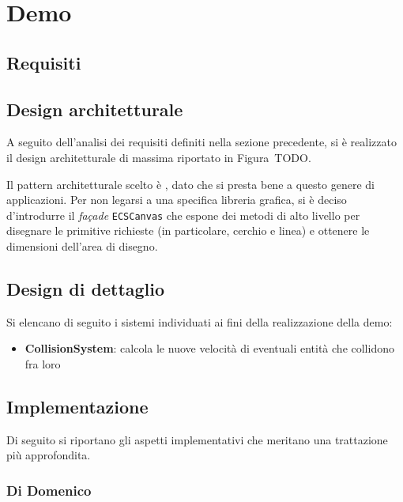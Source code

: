 \chapter{Demo}\label{ch:demo}

\section{Requisiti}\label{sec:demo-requisiti}

\section{Design architetturale}\label{sec:demo-design-architetturale}
A seguito dell'analisi dei requisiti definiti nella sezione precedente, si è realizzato il design architetturale di
massima riportato in Figura~TODO.

Il pattern architetturale scelto è \ECS, dato che si presta bene a questo genere di applicazioni.
Per non legarsi a una specifica libreria grafica, si è deciso d'introdurre il \textit{façade} \texttt{ECSCanvas}
che espone dei metodi di alto livello per disegnare le primitive richieste (in particolare, cerchio e linea) e ottenere
le dimensioni dell'area di disegno.

\section{Design di dettaglio}\label{sec:demo-design-di-dettaglio}

Si elencano di seguito i sistemi individuati ai fini della realizzazione della demo:
\begin{itemize}
    \item \textbf{CollisionSystem}: calcola le nuove velocità di eventuali entità che collidono fra loro
\end{itemize}

\section{Implementazione}\label{sec:demo-implementazione}

Di seguito si riportano gli aspetti implementativi che meritano una trattazione più approfondita.

\subsection{Di Domenico}\label{subsec:demo-di-domenico}


